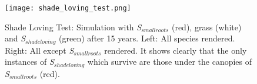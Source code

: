 \begin{figure}
\center
	\texttt{[image: shade\_loving\_test.png]}
	\caption{ Shade Loving Test: Simulation with \textit{S$_{smallroots}$} (red), grass (white) and \textit{S$_{shadeloving}$} (green) after 15 years. Left: All species rendered. Right: All except \textit{S$_{smallroots}$} rendered. It shows clearly that the only instances of \textit{S$_{shadeloving}$} which survive are those under the canopies of \textit{S$_{smallroots}$} (red).}
	\label{fig:shade_loving_test}
\end{figure}
